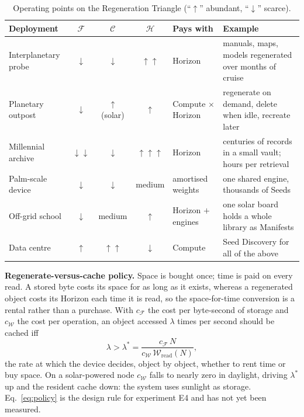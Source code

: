 \documentclass[11pt,a4paper]{article}
\theoremstyle{definition}
\theoremstyle{plain}
\theoremstyle{remark}
\newcommand{\Foot}{\mathcal{F}}
\newcommand{\Comp}{\mathcal{C}}
\newcommand{\Hori}{\mathcal{H}}
\newcommand{\Work}{\mathcal{W}}
\begin{document}
\begin{table}[!htb]
\centering\small
\caption{Operating points on the Regeneration Triangle (``$\uparrow$'' abundant, ``$\downarrow$'' scarce).}
\label{tab:deploy}
\begin{tabular}{@{}lccclp{4.5cm}@{}}
\toprule
\textbf{Deployment} & $\Foot$ & $\Comp$ & $\Hori$ & \textbf{Pays with} & \textbf{Example} \\
\midrule
Interplanetary probe & $\downarrow$ & $\downarrow$ & $\uparrow\uparrow$ & Horizon & manuals, maps, models regenerated over months of cruise \\
Planetary outpost & $\downarrow$ & $\uparrow$ (solar) & $\uparrow$ & Compute $\times$ Horizon & regenerate on demand, delete when idle, recreate later \\
Millennial archive & $\downarrow\downarrow$ & $\downarrow$ & $\uparrow\uparrow\uparrow$ & Horizon & centuries of records in a small vault; hours per retrieval \\
Palm-scale device & $\downarrow$ & $\downarrow$ & medium & amortised weights & one shared engine, thousands of Seeds \\
Off-grid school & $\downarrow$ & medium & $\uparrow$ & Horizon $+$ engines & one solar board holds a whole library as Manifests \\
Data centre & $\uparrow$ & $\uparrow\uparrow$ & $\downarrow$ & Compute & Seed Discovery for all of the above \\
\bottomrule
\end{tabular}
\end{table}

\textbf{Regenerate-versus-cache policy.} Space is bought once; time is paid on every read. A
stored byte costs its space for as long as it exists, whereas a regenerated object costs its
Horizon each time it is read, so the space-for-time conversion is a rental rather than a purchase.
With $c_{\Foot}$ the cost per byte-second of storage and $c_{\Work}$ the cost per operation, an
object accessed $\lambda$ times per second should be cached iff
\begin{equation}
  \lambda>\lambda^{*}=\frac{c_{\Foot}\,N}{c_{\Work}\,\Work_{\mathrm{read}}(N)},
  \label{eq:policy}
\end{equation}
the rate at which the device decides, object by object, whether to rent time or buy space. On a
solar-powered node $c_{\Work}$ falls to nearly zero in daylight, driving $\lambda^{*}$ up and the
resident cache down: the system uses sunlight as storage. Eq.~\eqref{eq:policy} is the design
rule for experiment E4 and has not yet been measured.
\end{document}
